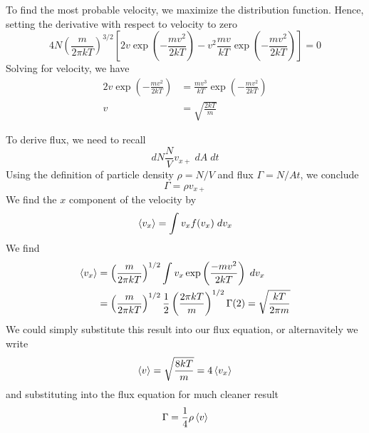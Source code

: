\documentclass[../../../Main.tex]{subfiles}
\begin{document}
To find the most probable velocity, we maximize the distribution function. Hence, setting the derivative with respect to velocity to zero
\begin{equation*}
    4N\left(\frac{m}{2\pi kT}\right)^{3/2}\left[2v\exp\left(-\frac{m v^2}{2k T}\right)-v^2\frac{mv}{kT}\exp\left(-\frac{m v^2}{2k T}\right)\right]=0
\end{equation*}
Solving for velocity, we have 
\begin{align*}
    2v\exp\left(-\frac{m v^2}{2k T}\right)&=\frac{mv^3}{kT}\exp\left(-\frac{m v^2}{2k T}\right)\\
    v&=\sqrt{\frac{2kT}{m}}
\end{align*}

To derive flux, we need to recall
\begin{equation*}
    dN\frac{N}{V}v_{x+}\;dA\;dt
\end{equation*}
Using the definition of particle density $\rho=N/V$ and flux $\Gamma=N/At$, we conclude 
\begin{equation*}
    \Gamma=\rho v_{x+}
\end{equation*}
We find the $x$ component of the velocity by 
\begin{equation*}
    \braket{v_x}=\int v_xf(v_x)\;dv_x
\end{equation*} 
We find 
\begin{align*}
    \braket{v_x}&=\left(\frac{m}{2\pi kT}\right)^{1/2}\int v_x\exp\left(\frac{-m v^2}{2kT}\right)\;dv_x\\
    &=\left(\frac{m}{2\pi kT}\right)^{1/2}\frac{1}{2}\left(\frac{2\pi kT}{m}\right)^{1/2}\Gamma(2)=\sqrt{\frac{kT}{2\pi m}}
\end{align*}
We could simply substitute this result into our flux equation, or alternavitely we write 
\begin{equation*}
    \braket{v}=\sqrt{\frac{8kT}{m}}=4\braket{v_x}
\end{equation*}
and substituting into the flux equation for much cleaner result
\begin{equation*}
    \Gamma=\frac{1}{4}\rho\braket{v}
\end{equation*}
\end{document}
